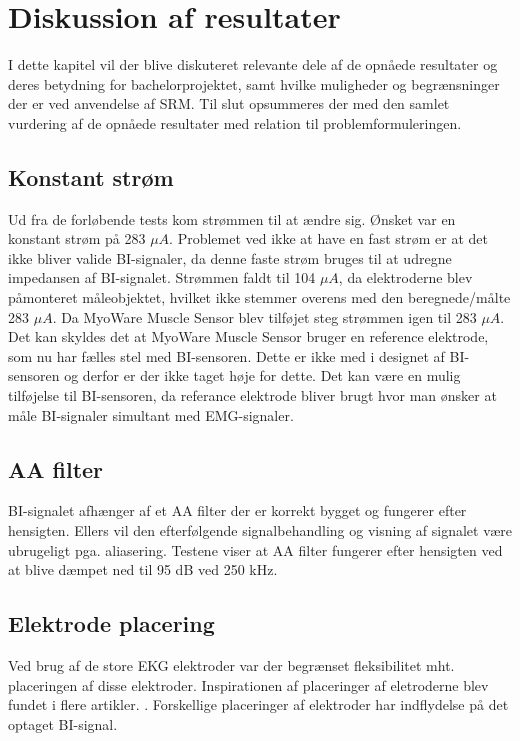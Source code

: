\chapter{Diskussion af resultater}

I dette kapitel vil der blive diskuteret relevante dele af de opnåede resultater og deres betydning for bachelorprojektet, samt hvilke muligheder og begrænsninger der er ved anvendelse af SRM. Til slut opsummeres der med den samlet vurdering af de opnåede resultater med relation til problemformuleringen.

\section{Konstant strøm}
Ud fra de forløbende tests kom strømmen til at ændre sig. Ønsket var en konstant strøm på 283 $\mu A$. Problemet ved ikke at have en fast strøm er at det ikke bliver valide BI-signaler, da denne faste strøm bruges til at udregne impedansen af BI-signalet. Strømmen faldt til 104 $\mu A$, da elektroderne blev påmonteret måleobjektet, hvilket ikke stemmer overens med den beregnede/målte 283 $\mu A$. Da MyoWare Muscle Sensor blev tilføjet steg strømmen igen til 283 $\mu A$. Det kan skyldes det at MyoWare Muscle Sensor bruger en reference elektrode, som nu har fælles stel med BI-sensoren. Dette er ikke med i designet af BI-sensoren og derfor er der ikke taget høje for dette. Det kan være en mulig tilføjelse til BI-sensoren, da referance elektrode bliver brugt hvor man ønsker at måle BI-signaler simultant med EMG-signaler\cite{Nahrstaedt2012a}. 

\section{AA filter}
BI-signalet afhænger af et AA filter der er korrekt bygget og fungerer efter hensigten. Ellers vil den efterfølgende signalbehandling og visning af signalet være ubrugeligt pga. aliasering. Testene viser at AA filter fungerer efter hensigten ved at blive dæmpet ned til 95 dB ved 250 kHz. 


\section{Elektrode placering}
Ved brug af de store EKG elektroder var der begrænset fleksibilitet mht. placeringen af disse elektroder. Inspirationen af placeringer af eletroderne blev fundet i flere artikler.\cite{Chester}
\cite{Schultheiss2013}. Forskellige placeringer af elektroder har indflydelse på det optaget BI-signal\cite{Yamamoto2000}.  




